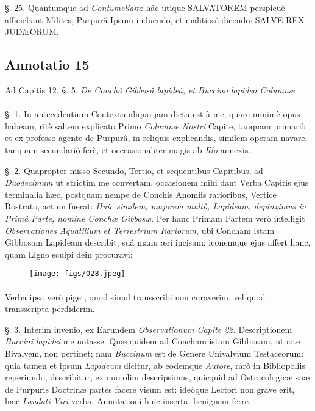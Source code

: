 \documentclass[a4paper, 11pt, oneside, polutonikogreek, german]{article}
\begin{document}
§. 25. Quantumque ad \emph{Contumeliam}: hâc utique SALVATOREM perspicuè afficiebant Milites, Purpurâ Ipsum induendo, et malitiosè dicendo: SALVE REX JUDÆORUM.

\subsection{Annotatio 15}
\begin{center}
Ad Capitis 12. §. 5. \emph{De Conchâ Gibbosâ lapideâ, et Buccino lapideo Columnæ}.
\end{center}
\paragraph{}
§. 1. In antecedentium Contextu aliquo jam-dictū est à me, quare minimè opus habeam, ritè saltem explicato Primo \emph{Columnæ Nostri} Capite, tanquam primariò et ex professo agente de Purpurâ, in reliquis explicandis, similem operam navare, tanquam secundariò ferè, et occcasionaliter magis ab \emph{Illo} annexis.

§. 2. Quapropter misso Secundo, Tertio, et sequentibus Capitibus, ad \emph{Duodecimum} ut strictim me convertam, occasionem mihi dant Verba Capitis ejus terminalia hæc, postquam nempe de Conchis Anomiis rarioribus, Vertice Rostrato, actum fuerat: \emph{Huic similem, majorem multò, Lapideam, depinximus in Primâ Parte, nomine Conchæ Gibbosæ}. Per hanc Primam Partem verò intelligit \emph{Observationes Aquatilium et Terrestrium Rariorum}, ubi Concham istam Gibbosam Lapideam describit, suâ manu æri incisam; iconemque ejus affert hanc, quam Ligno sculpi dein procuravi:

\begin{figure}[H]
\centering
\texttt{[image: figs/028.jpeg]}
\end{figure}
\paragraph{}
Verba ipsa verò piget, quod simul transscribi non curaverim, vel quod transscripta perdiderim.

§. 3. Interim invenio, ex Earundem \emph{Observationum Capite 22.} Descriptionem \emph{Buccini lapidei} me notasse. Quæ quidem ad Concham istam Gibbosam, utpote Bivalvem, non pertinet; nam \emph{Buccinum} est de Genere Univalvium Testaceorum: quia tamen et ipsum \emph{Lapideum} dicitur, ab eodemque \emph{Autore}, rarò in Bibliopoliis reperiundo, describitur, ex quo olim descripsimus, quicquid ad Ostracologicæ suæ de Purpuris Doctrinæ partes facere visum est: ideòque Lectori non grave erit, hæc \emph{Laudati Viri} verba, Annotationi huic inserta, benignem ferre.
\end{document}
